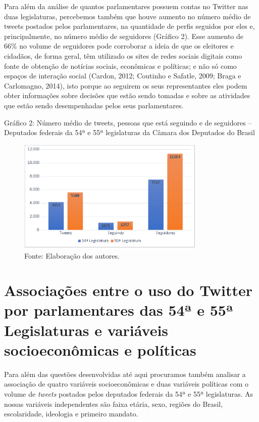 Para além da análise de quantos parlamentares possuem contas no Twitter
nas duas legislaturas, percebemos também que houve aumento no número
médio de tweets postados pelos parlamentares, na quantidade de perfis
seguidos por eles e, principalmente, no número médio de seguidores
(Gráfico 2). Esse aumento de 66\% no volume de seguidores pode
corroborar a ideia de que os eleitores e cidadãos, de forma geral, têm
utilizado os sites de redes sociais digitais como fonte de obtenção de
notícias sociais, econômicas e políticas; e não só como espaços de
interação social (Cardon, 2012; Coutinho e Safatle, 2009; Braga e
Carlomagno, 2014), isto porque ao seguirem os seus representantes eles
podem obter informações sobre decisões que estão sendo tomadas e sobre
as atividades que estão sendo desempenhadas pelos seus parlamentares.

\begin{center}
Gráfico 2: Número médio de tweets, pessoas que está seguindo e de
seguidores -- Deputados federais da 54ª e 55ª legislaturas da Câmara dos
Deputados do Brasil
\end{center}

\begin{figure}[!ht]
\centering
 \includegraphics[width=90mm]{./imgs/graf2_2.png}
\caption{Fonte: Elaboração dos autores.}
\end{figure}


\section{Associações entre o uso do Twitter por parlamentares das 54ª
e 55ª Legislaturas e variáveis socioeconômicas e políticas}

Para além das questões desenvolvidas até aqui procuramos também analisar
a associação de quatro variáveis socioeconômicas e duas variáveis
políticas com o volume de \emph{tweets} postados pelos deputados
federais da 54ª e 55ª legislaturas. As nossas variáveis independentes
são faixa etária, sexo, regiões do Brasil, escolaridade, ideologia e
primeiro mandato.

